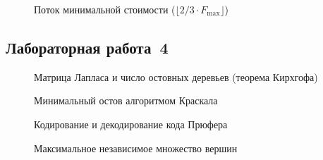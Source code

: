 \begin{figure}[h]
    \centering
    \caption{Поток минимальной стоимости ($\lfloor 2/3 \cdot F_{\max} \rfloor$)}
\end{figure}

\subsection{Лабораторная работа~4}

\begin{figure}[h]
    \centering
    \caption{Матрица Лапласа и число остовных деревьев (теорема Кирхгофа)}
\end{figure}

\begin{figure}[h]
    \centering
    \caption{Минимальный остов алгоритмом Краскала}
\end{figure}

\begin{figure}[h]
    \centering
    \caption{Кодирование и декодирование кода Прюфера}
\end{figure}

\begin{figure}[h]
    \centering
    \caption{Максимальное независимое множество вершин}
\end{figure}
